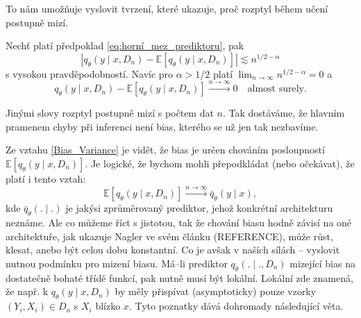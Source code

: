 To nám umožňuje vyslovit tvrzení, které ukazuje, proč rozptyl během učení postupně mizí.
\begin{theorem}
    Nechť platí předpoklad \ref{eq:horní_mez_prediktoru}, pak 
    \begin{equation}
        \left| q_\theta(y \mid x, D_n) - \mathbb{E}[q_\theta(y \mid x, D_n)] \right| \lesssim n^{1/2 - \alpha}
    \end{equation}
    s vysokou pravděpodobností. 
    Navíc pro $\alpha > 1/2$ platí $\lim_{n \to \infty} n^{1/2-\alpha} = 0$ a 
    \begin{equation}
        q_\theta(y \mid x, D_n) - \mathbb{E}[q_\theta(y \mid x, D_n)] \xrightarrow{n \to \infty} 0 \quad \text{almost surely.}
    \end{equation}
\end{theorem}
Jinými slovy rozptyl postupně mizí s počtem dat $n$.
Tak dostáváme, že hlavním pramenem chyby při inferenci není bias, kterého se už jen tak nezbavíme.
\par   

Ze vztahu \ref{Bias_Variance} je vidět, že bias je určen chováním posloupností $\mathbb{E}[q_\theta(y \mid x, D_n)]$.
Je logické, že bychom mohli přepodkládat (nebo očekávat), že platí i tento vztah: 
$$\mathbb{E}[q_\theta(y \mid x, D_n)] \xrightarrow{n \to \infty} \bar{q}_\theta(y \mid x),$$
kde $\bar{q}_\theta(. \mid .)$ je jakýsi zprůměrovaný prediktor, jehož konkrétní architekturu neznáme.
Ale co můžeme říct s jistotou, tak že chování biasu hodně závisí na oné architektuře, jak ukazuje Nagler ve svém článku (REFERENCE), může růst, klesat, anebo být celou dobu konstantní.
Co je avšak v naších sílách – vyslovit nutnou podmínku pro mizení biasu. 
Má–li prediktor $q_\theta(. \mid ., D_n)$ mizející bias na dostatečně bohaté třídě funkcí, pak nutně musí být lokální.
Lokální zde znamená, že např. k $q_\theta(y \mid x, D_n)$ by měly přispívat (asymptoticky) pouze vzorky $(Y_i, X_i) \in D_n$ s $X_i$ blízko $x$.
Tyto poznatky dává dohromady následující věta.

